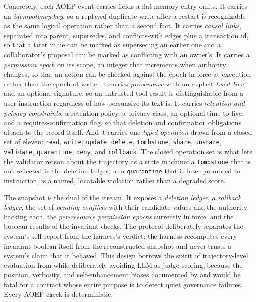 Concretely, each AOEP event carries fields a flat memory entry omits. It carries an \emph{idempotency key}, so a replayed duplicate write after a restart is recognizable as the same logical operation rather than a second fact. It carries \emph{causal links}, separated into parent, supersedes, and conflicts-with edges plus a transaction id, so that a later value can be marked as superseding an earlier one and a collaborator's proposal can be marked as conflicting with an owner's. It carries a \emph{permission epoch} on its scope, an integer that increments when authority changes, so that an action can be checked against the epoch in force at execution rather than the epoch at write. It carries \emph{provenance} with an explicit \emph{trust tier} and an optional signature, so an untrusted tool result is distinguishable from a user instruction regardless of how persuasive its text is. It carries \emph{retention and privacy constraints}, a retention policy, a privacy class, an optional time-to-live, and a requires-confirmation flag, so that deletion and confirmation obligations attach to the record itself. And it carries one \emph{typed operation} drawn from a closed set of eleven: \texttt{read}, \texttt{write}, \texttt{update}, \texttt{delete}, \texttt{tombstone}, \texttt{share}, \texttt{unshare}, \texttt{validate}, \texttt{quarantine}, \texttt{deny}, and \texttt{rollback}. The closed operation set is what lets the validator reason about the trajectory as a state machine: a \texttt{tombstone} that is not reflected in the deletion ledger, or a \texttt{quarantine} that is later promoted to instruction, is a named, locatable violation rather than a degraded score.

The snapshot is the dual of the stream. It exposes a \emph{deletion ledger}, a \emph{rollback ledger}, the set of \emph{pending conflicts} with their candidate values and the authority backing each, the \emph{per-resource permission epochs} currently in force, and the boolean results of the invariant checks. The protocol deliberately separates the system's self-report from the harness's verdict: the harness recomputes every invariant boolean itself from the reconstructed snapshot and never trusts a system's claim that it behaved. This design borrows the spirit of trajectory-level evaluation from \citet{you2026agentasjudge} while deliberately avoiding LLM-as-judge scoring, because the position, verbosity, and self-enhancement biases documented by \citet{zheng2023judgingllmasajudge} and \citet{shi2024judgingthejudges} would be fatal for a contract whose entire purpose is to detect quiet governance failures. Every AOEP check is deterministic.

